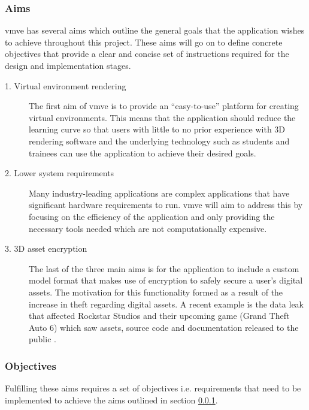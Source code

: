 \documentclass[11pt]{article}
\begin{document}
\subsubsection{Aims} \label{aims} 

\gls*{vmve} has several aims which outline the general goals that the
application wishes to achieve throughout this project. These aims will go on to
define concrete objectives that provide a clear and concise set of instructions
required for the design and implementation stages.


\begin{description}
  \item[1. Virtual environment rendering] The first aim of \gls*{vmve} is to
    provide an ``easy-to-use'' platform for creating virtual environments. This
    means that the application should reduce the learning curve so that users
    with little to no prior experience with 3D rendering software and the
    underlying technology such as students and trainees can use the application
    to achieve their desired goals.

  \item[2. Lower system requirements] Many industry-leading applications are
    complex applications that have significant hardware requirements to run.
    \gls*{vmve} will aim to address this by focusing on the efficiency of the
    application and only providing the necessary tools needed which are not
    computationally expensive.

  \item[3. 3D asset encryption] The last of the three main aims is for the
    application to include a custom model format that makes use of encryption to
    safely secure a user's digital assets. The motivation for this functionality
    formed as a result of the increase in theft regarding digital assets. A
    recent example is the data leak that affected Rockstar Studios and their
    upcoming game (Grand Theft Auto 6) which saw assets, source code and
    documentation released to the public \cite{gta_leak}.

\end{description}


\subsubsection{Objectives} \label{objectives}
Fulfilling these aims requires a set of objectives i.e. requirements that need
to be implemented to achieve the aims outlined in section \ref{aims}.
\end{document}
